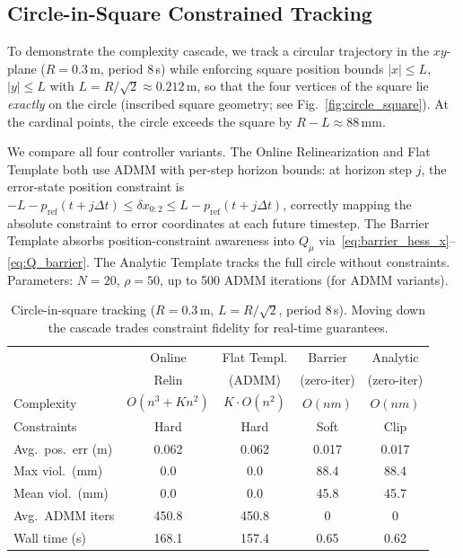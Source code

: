 \subsection{Circle-in-Square Constrained Tracking}\label{sec:circle_square}

To demonstrate the complexity cascade, we track a circular
trajectory in the $xy$-plane ($R = 0.3$\,m, period 8\,s)
while enforcing square position bounds
$|x| \leq L$, $|y| \leq L$
with $L = R / \sqrt{2} \approx 0.212$\,m, so that the
four vertices of the square lie \emph{exactly} on the circle
(inscribed square geometry; see Fig.~\ref{fig:circle_square}).
At the cardinal points, the circle exceeds the square by
$R - L \approx 88$\,mm.

We compare all four controller variants.
The Online Relinearization and Flat Template both use ADMM
with per-step horizon bounds: at horizon step $j$, the
error-state position constraint is
$-L - p_{\mathrm{ref}}(t{+}j\Delta t)
 \leq \delta x_{0:2}
 \leq L - p_{\mathrm{ref}}(t{+}j\Delta t)$,
correctly mapping the absolute constraint to error coordinates
at each future timestep.
The Barrier Template absorbs position-constraint awareness into
$Q_\mu$ via~\eqref{eq:barrier_hess_x}--\eqref{eq:Q_barrier}.
The Analytic Template tracks the full circle without constraints.
Parameters: $N = 20$, $\rho = 50$, up to 500 ADMM iterations
(for ADMM variants).

\begin{table}[t]
\centering
\caption{Circle-in-square tracking
  ($R=0.3$\,m, $L=R/\sqrt{2}$, period 8\,s).
  Moving down the cascade trades constraint fidelity for
  real-time guarantees.}
\label{tab:circle}
\begin{tabular}{@{}lcccc@{}}
\toprule
 & Online & Flat Templ. & Barrier & Analytic \\
 & Relin & (ADMM) & (zero-iter) & (zero-iter) \\
\midrule
Complexity & $O(n^3{+}Kn^2)$ & $K{\cdot}O(n^2)$ & $O(nm)$ & $O(nm)$ \\
Constraints & Hard & Hard & Soft & Clip \\
Avg.\ pos.\ err (m) & 0.062 & 0.062 & 0.017 & 0.017 \\
Max viol.\ (mm) & 0.0 & 0.0 & 88.4 & 88.4 \\
Mean viol.\ (mm) & 0.0 & 0.0 & 45.8 & 45.7 \\
Avg.\ ADMM iters & 450.8 & 450.8 & 0 & 0 \\
Wall time (s) & 168.1 & 157.4 & 0.65 & 0.62 \\
\bottomrule
\end{tabular}
\end{table}


